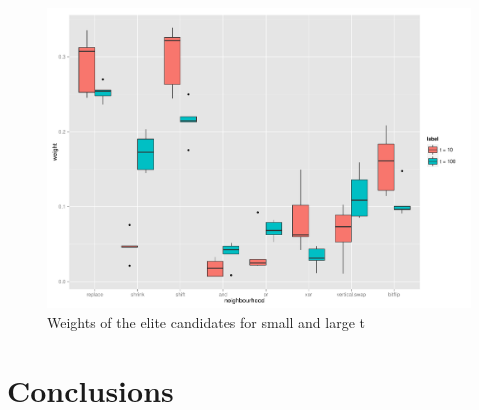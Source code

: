 \documentclass[]{article}
\begin{document}
\begin{figure}
	\includegraphics[width=\textwidth]{boxplot_t.pdf}
	\caption{Weights of the elite candidates for small and large t}
	\label{fig:t}
\end{figure}


\section{Conclusions}




\end{document}
